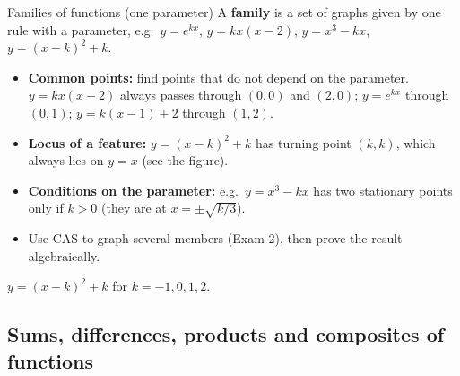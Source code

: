 \begin{cols}[0.58]
\begin{keyres}{Families of functions (one parameter)}\label{sec:families}
A \textbf{family} is a set of graphs given by one rule with a parameter, e.g.\ $y=e^{kx}$, $y=kx(x-2)$, $y=x^3-kx$, $y=(x-k)^2+k$.
\begin{itemize}
  \item \textbf{Common points:} find points that do not depend on the parameter. $y=kx(x-2)$ always passes through $(0,0)$ and $(2,0)$; $y=e^{kx}$ through $(0,1)$; $y=k(x-1)+2$ through $(1,2)$.
  \item \textbf{Locus of a feature:} $y=(x-k)^2+k$ has turning point $(k,k)$, which always lies on $y=x$ (see the figure).
  \item \textbf{Conditions on the parameter:} e.g.\ $y=x^3-kx$ has two stationary points only if $k>0$ (they are at $x=\pm\sqrt{k/3}$).
  \item Use CAS to graph several members (Exam 2), then prove the result algebraically.
\end{itemize}
\end{keyres}
\nextcol[0.39]
\centering
{}

{\scriptsize $y=(x-k)^2+k$ for $k=-1,0,1,2$.}
\end{cols}

\subsection{Sums, differences, products and composites of functions}
\label{sec:combo}

